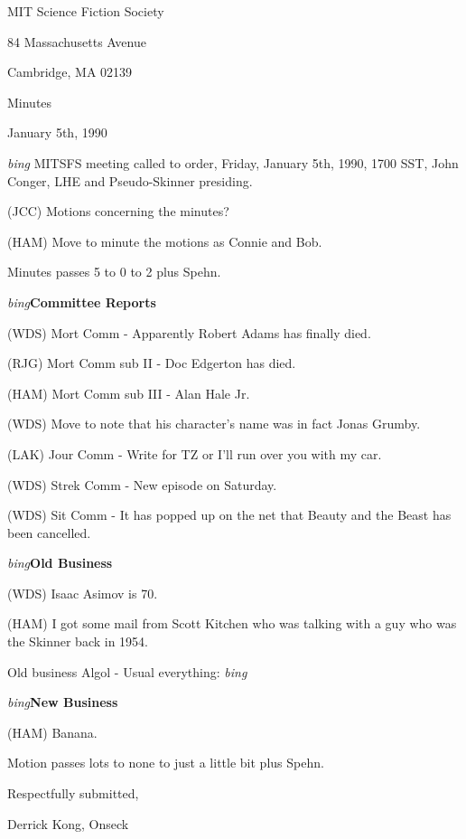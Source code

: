 \setlength{\topmargin}{-0.5in}
\setlength{\oddsidemargin}{0.0in}
\setlength{\evensidemargin}{0.0in}
\setlength{\textheight}{9in}
\setlength{\textwidth}{6.5in}



\begin{center}
MIT Science Fiction Society

84 Massachusetts Avenue

Cambridge, MA 02139

\vspace{0.2in}
Minutes

January 5th, 1990

\end{center}
 
\vspace{0.15in}
{\em bing\/}  MITSFS meeting called to order, Friday, January 5th, 1990,
1700 SST, John Conger, LHE and Pseudo-Skinner presiding.

(JCC) Motions concerning the minutes?

(HAM) Move to minute the motions as Connie and Bob.

Minutes passes 5 to 0 to 2 plus Spehn.

{\em bing\/}{\bf Committee Reports}

(WDS) Mort Comm - Apparently Robert Adams has finally died.

(RJG) Mort Comm sub II - Doc Edgerton has died.

(HAM) Mort Comm sub III - Alan Hale Jr.

(WDS) Move to note that his character's name was in fact Jonas Grumby.

(LAK) Jour Comm - Write for TZ or I'll run over you with my car.

(WDS) Strek Comm - New episode on Saturday.

(WDS) Sit Comm - It has popped up on the net that Beauty and the Beast has been cancelled.

{\em bing\/}{\bf Old Business}

(WDS) Isaac Asimov is 70.

(HAM) I got some mail from Scott Kitchen who was talking with a guy who was the Skinner back in 1954.

Old business Algol - Usual everything: {\em bing\/}

{\em bing\/}{\bf New Business}

(HAM) Banana.

Motion passes lots to none to just a little bit plus Spehn.

\vspace{0.15in}
\begin{center}
Respectfully submitted,

Derrick Kong, Onseck
\end{center}


